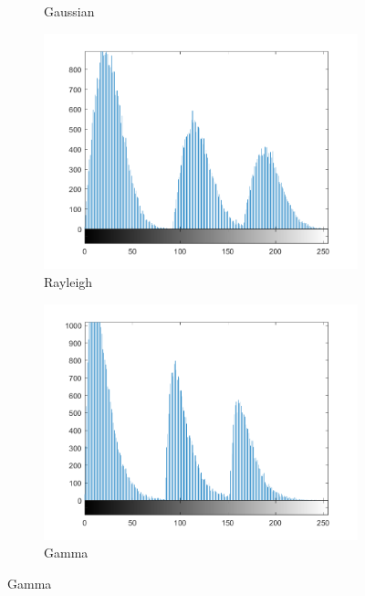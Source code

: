 \begin{figure}[h]
\begin{subfigure}[b]{0.25\linewidth}
		\caption{Gaussian}
		\label{fig:add_gaussian_hist}
	\end{subfigure}
  	\begin{subfigure}[b]{0.25\linewidth}
		\includegraphics[width=\linewidth]{myfigure/p4/41-rayleigh-hist.png}
		\caption{Rayleigh}
		\label{fig:add_rayleigh_hist}
	\end{subfigure}
  	\begin{subfigure}[b]{0.25\linewidth}
		\includegraphics[width=\linewidth]{myfigure/p4/41-gamma-hist.png}
		\caption{Gamma}
		\label{fig:add_gamma_hist}
	\end{subfigure}
  	

\end{figure}
